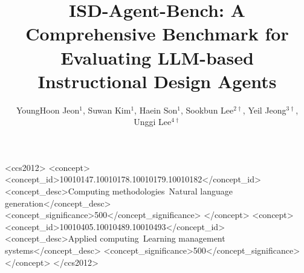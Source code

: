 \documentclass[sigconf,preprint]{acmart}
\begin{document}
\title{ISD-Agent-Bench: A Comprehensive Benchmark for Evaluating LLM-based Instructional Design Agents}

\author{YoungHoon Jeon$^{1}$, Suwan Kim$^{1}$, Haein Son$^{1}$, Sookbun Lee$^{2\dagger}$, Yeil Jeong$^{3\dagger}$, Unggi Lee$^{4\dagger}$}

\renewcommand{\shortauthors}{Jeon et al.}



\begin{CCSXML}
<ccs2012>
   <concept>
       <concept_id>10010147.10010178.10010179.10010182</concept_id>
       <concept_desc>Computing methodologies~Natural language generation</concept_desc>
       <concept_significance>500</concept_significance>
   </concept>
   <concept>
       <concept_id>10010405.10010489.10010493</concept_id>
       <concept_desc>Applied computing~Learning management systems</concept_desc>
       <concept_significance>500</concept_significance>
   </concept>
</ccs2012>
\end{CCSXML}



\maketitle










\end{document}
